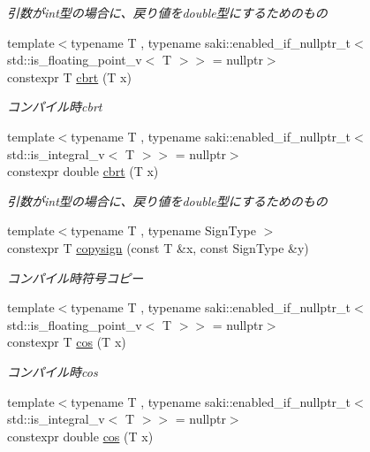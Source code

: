 \begin{DoxyCompactItemize}
\begin{DoxyCompactList}\small\item\em 引数がint型の場合に、戻り値をdouble型にするためのもの \end{DoxyCompactList}\item 
{\footnotesize template$<$typename T , typename saki\+::enabled\+\_\+if\+\_\+nullptr\+\_\+t$<$ std\+::is\+\_\+floating\+\_\+point\+\_\+v$<$ T $>$$>$  = nullptr$>$ }\\constexpr T \mbox{\hyperlink{namespacesaki_a8836c929b71a61cf0151d3b76eb7af15}{cbrt}} (T x)
\begin{DoxyCompactList}\small\item\em コンパイル時cbrt \end{DoxyCompactList}\item 
{\footnotesize template$<$typename T , typename saki\+::enabled\+\_\+if\+\_\+nullptr\+\_\+t$<$ std\+::is\+\_\+integral\+\_\+v$<$ T $>$$>$  = nullptr$>$ }\\constexpr double \mbox{\hyperlink{namespacesaki_a5a3d1ab0508dcff1fb2e17a4ef8a855d}{cbrt}} (T x)
\begin{DoxyCompactList}\small\item\em 引数がint型の場合に、戻り値をdouble型にするためのもの \end{DoxyCompactList}\item 
{\footnotesize template$<$typename T , typename Sign\+Type $>$ }\\constexpr T \mbox{\hyperlink{namespacesaki_a8bab6303ac2144b883080f04ebe26a0e}{copysign}} (const T \&x, const Sign\+Type \&y)
\begin{DoxyCompactList}\small\item\em コンパイル時符号コピー \end{DoxyCompactList}\item 
{\footnotesize template$<$typename T , typename saki\+::enabled\+\_\+if\+\_\+nullptr\+\_\+t$<$ std\+::is\+\_\+floating\+\_\+point\+\_\+v$<$ T $>$$>$  = nullptr$>$ }\\constexpr T \mbox{\hyperlink{namespacesaki_a82551963a8cab889ca6f76ed346d6f4f}{cos}} (T x)
\begin{DoxyCompactList}\small\item\em コンパイル時cos \end{DoxyCompactList}\item 
{\footnotesize template$<$typename T , typename saki\+::enabled\+\_\+if\+\_\+nullptr\+\_\+t$<$ std\+::is\+\_\+integral\+\_\+v$<$ T $>$$>$  = nullptr$>$ }\\constexpr double \mbox{\hyperlink{namespacesaki_ab1f49aa2d1182883ae8b4c01b346cc88}{cos}} (T x)

\end{DoxyCompactItemize}
